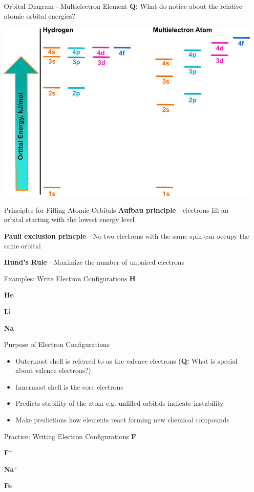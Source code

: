 \documentclass[11pt]{beamer}
\begin{document}
\begin{frame}{Orbital Diagram - Multielectron Element}
  \textbf{Q:} What do notice about the relative atomic orbital energies?
  
  \centering
  \includegraphics[scale=1.3]{orbital_energy}
\end{frame}

\begin{frame}{Principles for Filling Atomic Orbitals}
  \textbf{Aufbau principle} - electrons fill an orbital starting with
  the lowest energy level

  \textbf{Pauli exclusion princple} - No two electrons with the same
  spin can occupy the same orbital

  \textbf{Hund's Rule} - Maximize the number of unpaired electrons
\end{frame}

\begin{frame}{Examples: Write Electron Configurations}
  \textbf{H}
  \vspace{0.25in}
  
  \textbf{He}
  \vspace{0.25in}
  
  \textbf{Li}
  \vspace{0.25in}

  \textbf{Na}
\end{frame}

\begin{frame}{Purpose of Electron Configurations}
  \begin{itemize}
  \item Outermost shell is referred to as the valence
    electrons (\textbf{Q:} What is special about valence electrons?)
  \item Innermost shell is the core electrons
  \item Predicts stability of the atom e.g. unfilled orbitals
    indicate instability
  \item Make predictions how elements react forming new chemical
    compounds
  \end{itemize}
\end{frame}

\begin{frame}{Practice: Writing Electron Configurations}
  \textbf{F}
  \vspace{0.25in}
  
  \textbf{F$^-$}
  \vspace{0.25in}
  
  \textbf{Na$^+$}
  \vspace{0.25in}

  \textbf{Fe}  
\end{frame}
\end{document}
